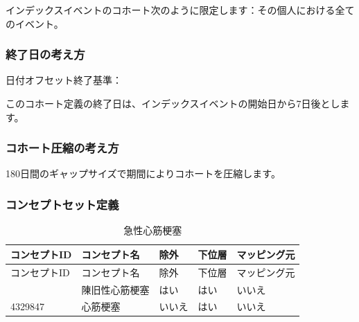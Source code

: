 \documentclass[
  11pt]{book}
\theoremstyle{definition}
\theoremstyle{definition}
\theoremstyle{definition}
\theoremstyle{definition}
\theoremstyle{remark}
\begin{document}
インデックスイベントのコホート次のように限定します：その個人における全てのイベント。

\subsubsection*{終了日の考え方}\label{ux7d42ux4e86ux65e5ux306eux8003ux3048ux65b9-2}

日付オフセット終了基準：

このコホート定義の終了日は、インデックスイベントの開始日から7日後とします。

\subsubsection*{コホート圧縮の考え方}\label{ux30b3ux30dbux30fcux30c8ux5727ux7e2eux306eux8003ux3048ux65b9-2}

180日間のギャップサイズで期間によりコホートを圧縮します。

\subsubsection*{コンセプトセット定義}\label{ux30b3ux30f3ux30bbux30d7ux30c8ux30bbux30c3ux30c8ux5b9aux7fa9-2}

\begin{longtable}[]{@{}lllll@{}}
\caption{\label{tab:ami} 急性心筋梗塞}\tabularnewline
\toprule\noalign{}
コンセプトID & コンセプト名 & 除外 & 下位層 & マッピング元 \\
\midrule\noalign{}
\endfirsthead
\toprule\noalign{}
コンセプトID & コンセプト名 & 除外 & 下位層 & マッピング元 \\
\midrule\noalign{}
\endhead
\bottomrule\noalign{}
\endlastfoot
314666 & 陳旧性心筋梗塞 & はい & はい & いいえ \\
4329847 & 心筋梗塞 & いいえ & はい & いいえ \\
\end{longtable}
\end{document}
